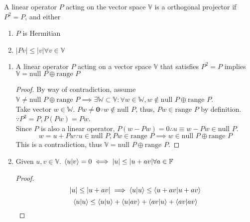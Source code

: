 \begin{sol}

\begin{theorem}
A linear operator $P$ acting on the vector space $\mathbb V$ is a orthogonal projector if $P^2=P$, and either
\begin{enumerate}
\item
$P$ is Hermitian
\item 
$|Pv|\leq|v|\forall v\in\mathbb V$
\end{enumerate}
 \end{theorem}
 \begin{enumerate}[label=\textbf{(\alph*)}]
 \item
\begin{lemma}
A linear operator $P$ acting on a vector space $\mathbb V$ that satisfies $P^2=P$ implies $\mathbb V=\text{null } P\oplus \text{range } P$ 
\end{lemma}
\begin{proof}
By way of contradiction, assume $\mathbb V\neq \text{null }P\oplus\text{range }P\implies\exists\mathbb W\subset\mathbb V:\forall w\in\mathbb W, w\notin\text{null }P\oplus\text{range }P$. \\
Take vector $w\in\mathbb W$. $Pw\neq \mathbf{0}\because w\notin\text{null }P$, thus, $Pw\in \text{range }P$ by definition.\\ $\because P^2=P, P(Pw)=Pw$. \\Since $P$ is also a linear operator, $P(w-Pw)=0\therefore u\equiv w-Pw\in \text{null }P$.
\begin{equation}
	w=u+Pw\because u\in\text{null }P,Pw\in\text{range } P\implies w\in\text{null }P\oplus\text{range }P
\end{equation} 
This is a contradiction, thus $\mathbb V=\text{null }P\oplus\text{range }P$.
\end{proof}
\item
\begin{lemma}
Given $u,v\in\mathbb V$. $\braket{u}{v}=0\iff|u|\leq|u+av|\forall a\in \mathbb F$ 
\end{lemma}
\begin{proof}
\begin{equation}
	 |u|\leq|u+av|\implies\braket{u}{u}\leq\braket{u+av}{u+av}
\end{equation} \begin{equation}
	\braket{u}{u}\leq\braket{u}{u}+\braket{u}{av}+\braket{av}{u}+\braket{av}{av}
\end{equation}
\begin{equation}

\end{equation}
\end{proof}
\end{enumerate}
\end{sol}
